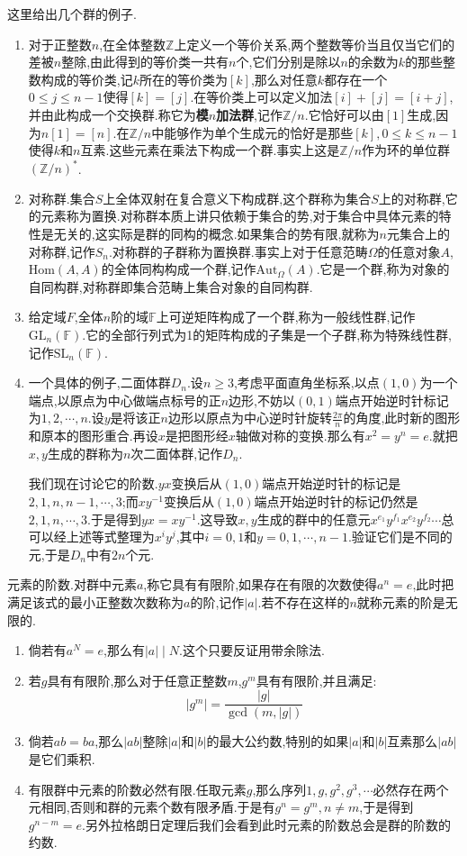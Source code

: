 这里给出几个群的例子.
\begin{enumerate}
	\item 对于正整数$n$,在全体整数$\mathbb{Z}$上定义一个等价关系,两个整数等价当且仅当它们的差被$n$整除,由此得到的等价类一共有$n$个,它们分别是除以$n$的余数为$k$的那些整数构成的等价类,记$k$所在的等价类为$[k]$,那么对任意$k$都存在一个$0\le j\le n-1$使得$[k]=[j]$.在等价类上可以定义加法$[i]+[j]=[i+j]$,并由此构成一个交换群.称它为\textbf{模$n$加法群},记作$\mathbb{Z}/n$.它恰好可以由$[1]$生成,因为$n[1]=[n]$.在$\mathbb{Z}/n$中能够作为单个生成元的恰好是那些$[k],0\le k\le n-1$使得$k$和$n$互素.这些元素在乘法下构成一个群.事实上这是$\mathbb{Z}/n$作为环的单位群$(\mathbb{Z}/n)^*$.
	\item 对称群.集合$S$上全体双射在复合意义下构成群,这个群称为集合$S$上的对称群,它的元素称为置换.对称群本质上讲只依赖于集合的势,对于集合中具体元素的特性是无关的,这实际是群的同构的概念.如果集合的势有限,就称为$n$元集合上的对称群,记作$S_n$.对称群的子群称为置换群.事实上对于任意范畴$\Omega$的任意对象$A$,$\mathrm{Hom}(A,A)$的全体同构构成一个群,记作$\mathrm{Aut}_{\Omega}(A)$.它是一个群,称为对象的自同构群,对称群即集合范畴上集合对象的自同构群.
	\item 给定域$F$,全体$n$阶的域$\mathbb{F}$上可逆矩阵构成了一个群,称为一般线性群,记作$\mathrm{GL}_n(\mathbb{F})$.它的全部行列式为1的矩阵构成的子集是一个子群,称为特殊线性群,记作$\mathrm{SL}_n(\mathbb{F})$.
	\item 一个具体的例子,二面体群$D_n$.设$n\ge3$,考虑平面直角坐标系,以点$(1,0)$为一个端点,以原点为中心做端点标号的正$n$边形,不妨以$(0,1)$端点开始逆时针标记为$1,2,\cdots,n$.设$y$是将该正$n$边形以原点为中心逆时针旋转$\frac{2\pi}{n}$的角度,此时新的图形和原本的图形重合.再设$x$是把图形经$x$轴做对称的变换.那么有$x^2=y^n=e$.就把$x,y$生成的群称为$n$次二面体群,记作$D_n$.
	
	我们现在讨论它的阶数.$yx$变换后从$(1,0)$端点开始逆时针的标记是$2,1,n,n-1,\cdots,3$;而$xy^{-1}$变换后从$(1,0)$端点开始逆时针的标记仍然是$2,1,n,\cdots,3$.于是得到$yx=xy^{-1}$.这导致$x,y$生成的群中的任意元$x^{e_1}y^{f_1}x^{e_2}y^{f_2}\cdots$总可以经上述等式整理为$x^iy^j$,其中$i=0,1$和$y=0,1,\cdots,n-1$.验证它们是不同的元,于是$D_n$中有$2n$个元.
\end{enumerate}

元素的阶数.对群中元素$a$,称它具有有限阶,如果存在有限的次数使得$a^n=e$,此时把满足该式的最小正整数次数称为$a$的阶,记作$|a|$.若不存在这样的$n$就称元素的阶是无限的.

\begin{enumerate}
	\item 倘若有$a^N=e$,那么有$|a|\mid N$.这个只要反证用带余除法.
	\item 若$g$具有有限阶,那么对于任意正整数$m$,$g^m$具有有限阶,并且满足:
	$$|g^m|=\frac{|g|}{\gcd(m,|g|)}$$
	\item 倘若$ab=ba$,那么$|ab|$整除$|a|$和$|b|$的最大公约数,特别的如果$|a|$和$|b|$互素那么$|ab|$是它们乘积.
	\item 有限群中元素的阶数必然有限.任取元素$g$,那么序列$1,g,g^2,g^3,\cdots$必然存在两个元相同,否则和群的元素个数有限矛盾.于是有$g^n=g^m,n\not=m$,于是得到$g^{n-m}=e$.另外拉格朗日定理后我们会看到此时元素的阶数总会是群的阶数的约数.
\end{enumerate}


